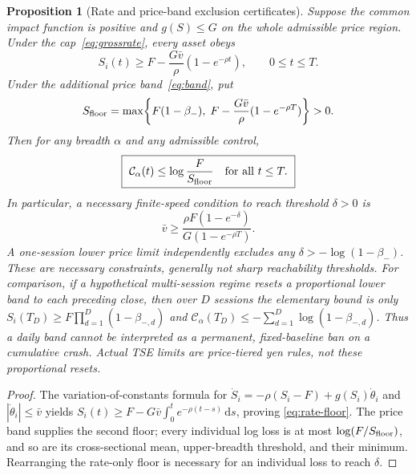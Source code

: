\documentclass[11pt]{article}
\numberwithin{equation}{section}
\newtheorem{proposition}[theorem]{Proposition}
\theoremstyle{definition}
\theoremstyle{remark}
\newcommand{\dd}{\,\mathrm{d}}
\begin{document}
\begin{proposition}[Rate and price-band exclusion certificates]\label{prop:rate-band}
Suppose the common impact function is positive and $g(S)\le G$ on the whole admissible price region. Under the cap~\eqref{eq:grossrate}, every asset obeys
\begin{equation}\label{eq:rate-floor}
 S_i(t)\ge F-\frac{G\bar v}{\rho}(1-e^{-\rho t}),\qquad 0\le t\le T.
\end{equation}
Under the additional price band~\eqref{eq:band}, put
\begin{equation}\label{eq:twofloors}
 S_{\rm floor}=\max\!\left\{F(1-\beta_-),\;F-\frac{G\bar v}{\rho}(1-e^{-\rho T})\right\}>0.
\end{equation}
Then for any breadth $\alpha$ and any admissible control,
\begin{equation}\label{eq:constrained-crisis}
\boxed{\ \mathcal C_\alpha(t)\le \log\frac{F}{S_{\rm floor}}\quad\hbox{for all }t\le T.\ }
\end{equation}
In particular, a necessary finite-speed condition to reach threshold $\delta>0$ is
\begin{equation}\label{eq:min-speed}
\boxed{\ \bar v\ge\frac{\rho F(1-e^{-\delta})}{G(1-e^{-\rho T})}.\ }
\end{equation}
A one-session lower price limit independently excludes any $\delta> -\log(1-\beta_-)$. These are \emph{necessary} constraints, generally not sharp reachability thresholds. For comparison, if a \emph{hypothetical} multi-session regime resets a proportional lower band to each preceding close, then over $D$ sessions the elementary bound is only
$S_i(T_D)\ge F\prod_{d=1}^D(1-\beta_{-,d})$ and
$\mathcal C_\alpha(T_D)\le-\sum_{d=1}^D\log(1-\beta_{-,d})$.
Thus a daily band cannot be interpreted as a permanent, fixed-baseline ban on a cumulative crash. Actual TSE limits are price-tiered yen rules, not these proportional resets.
\end{proposition}
\begin{proof}
The variation-of-constants formula for $\dot S_i=-\rho(S_i-F)+g(S_i)\dot\theta_i$ and $|\dot\theta_i|\le\bar v$ yields $S_i(t)\ge F-G\bar v\int_0^t e^{-\rho(t-s)}\dd s$, proving \eqref{eq:rate-floor}. The price band supplies the second floor; every individual log loss is at most $\log(F/S_{\rm floor})$, and so are its cross-sectional mean, upper-breadth threshold, and their minimum. Rearranging the rate-only floor is necessary for an individual loss to reach $\delta$.
\end{proof}
\end{document}
